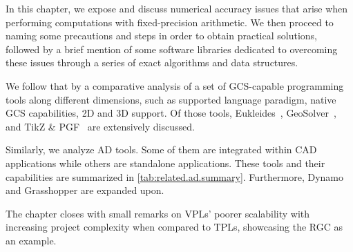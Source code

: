 %
\label{chap:related}
\cleardoublepage{}

\noindent
In this chapter, we expose and discuss numerical accuracy issues that arise when
performing computations with fixed-precision arithmetic.  We then proceed to
naming some precautions and steps in order to obtain practical solutions,
followed by a brief mention of some software libraries dedicated to overcoming
these issues through a series of exact algorithms and data structures.

We follow that by a comparative analysis of a set of \ac{GCS}-capable
programming tools along different dimensions, such as supported language
paradigm, native \ac{GCS} capabilities, 2D and 3D support.  Of those tools,
Eukleides~\cite{Obrecht:2010:EM}, GeoSolver~\cite{Van:2009:NRCRASSGC}, and
\acs{TikZ} \& \acs{PGF}~\cite{Tantau:2021:TikZ} are extensively discussed.

Similarly, we analyze \ac{AD} tools.  Some of them are integrated within
\ac{CAD} applications while others are standalone applications.  These tools and
their capabilities are summarized in \cref{tab:related.ad.summary}.
Furthermore, Dynamo and Grasshopper are expanded upon.

The chapter closes with small remarks on \acp{VPL}' poorer scalability with
increasing project complexity when compared to \acp{TPL}, showcasing the
\ac{RGC} as an example.





